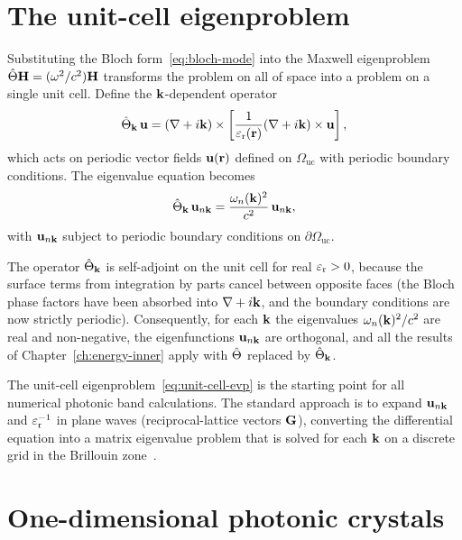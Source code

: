 \section{The unit-cell eigenproblem}
\label{sec:unit-cell}

Substituting the Bloch form~\eqref{eq:bloch-mode} into the Maxwell
eigenproblem $\hat{\Theta}\mathbf{H} = (\omega^2/c^2)\mathbf{H}$ transforms the problem on
all of space into a problem on a single unit cell. Define the
$\mathbf{k}$-dependent operator
\begin{equation}
 \hat{\Theta}_{\mathbf{k}}\,\mathbf{u}
 = (\nabla + i\mathbf{k})\times
 \left[\frac{1}{\varepsilon_{\mathrm{r}}(\mathbf{r})}
 (\nabla + i\mathbf{k})\times\mathbf{u}\right],
 \label{eq:theta-k}
\end{equation}
which acts on periodic vector fields $\mathbf{u}(\mathbf{r})$ defined on
$\Omega_{\mathrm{uc}}$ with periodic boundary conditions. The eigenvalue
equation becomes
\begin{equation}
 \hat{\Theta}_{\mathbf{k}}\,\mathbf{u}_{n\mathbf{k}}
 = \frac{\omega_n(\mathbf{k})^2}{c^2}\,\mathbf{u}_{n\mathbf{k}},
 \label{eq:unit-cell-evp}
\end{equation}
with $\mathbf{u}_{n\mathbf{k}}$ subject to periodic boundary conditions on
$\partial\Omega_{\mathrm{uc}}$.

The operator $\hat{\Theta}_{\mathbf{k}}$ is self-adjoint on the unit cell for real
$\varepsilon_{\mathrm{r}} > 0$, because the surface terms from integration by parts cancel
between opposite faces (the Bloch phase factors have been absorbed into
$\nabla + i\mathbf{k}$, and the boundary conditions are now strictly periodic).
Consequently, for each $\mathbf{k}$ the eigenvalues
$\omega_n(\mathbf{k})^2/c^2$ are real and non-negative, the eigenfunctions
$\mathbf{u}_{n\mathbf{k}}$ are orthogonal, and all the results of
Chapter~\ref{ch:energy-inner} apply with $\hat{\Theta}$ replaced by $\hat{\Theta}_{\mathbf{k}}$.

The unit-cell eigenproblem~\eqref{eq:unit-cell-evp} is the starting point
for all numerical photonic band calculations. The standard approach
is to expand $\mathbf{u}_{n\mathbf{k}}$ and $\varepsilon_{\mathrm{r}}^{-1}$ in plane waves
(reciprocal-lattice vectors $\mathbf{G}$), converting the differential equation
into a matrix eigenvalue problem that is solved for each $\mathbf{k}$ on a
discrete grid in the Brillouin zone~\cite{paz2019tutorial}.


\section{One-dimensional photonic crystals}
\label{sec:1d-photonic-crystal}

